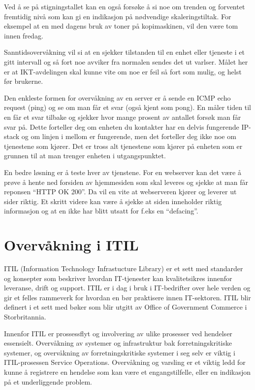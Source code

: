 Ved å se på stigningstallet kan en også forsøke å si noe om trenden og forventet fremtidig nivå som kan gi en indikasjon på nødvendige skaleringstiltak. For eksempel at en med dagens bruk av toner på kopimaskinen, vil den være tom innen fredag. 

Sanntidsovervåkning vil si at en sjekker tilstanden til en enhet eller tjeneste i et gitt intervall og så fort noe avviker fra normalen sendes det ut varlser. Målet her er at IKT-avdelingen skal kunne vite om noe er feil så fort som mulig, og helst før brukerne.

Den enkleste formen for overvåkning av en server er å sende en ICMP echo request (ping) og se om man får et svar (også kjent som pong). En måler tiden til en får et svar tilbake og sjekker hvor mange prosent av antallet forsøk man får svar på. Dette forteller deg om enheten du kontakter har en delvis fungerende IP-stack og om linjen i mellom er fungerende, men det forteller deg ikke noe om tjenestene som kjører. Det er tross alt tjenestene som kjører på enheten som er grunnen til at man trenger enheten i utgangspunktet.

En bedre løsning er å teste hver av tjenstene. For en webserver kan det være å prøve å hente ned forsiden av hjemmesiden som skal leveres og sjekke at man får reponsen “HTTP OK 200”. Da vil en vite at webserveren kjører og leverer ut sider riktig. Et skritt videre kan være å sjekke at siden inneholder riktig informasjon og at en ikke har blitt utsatt for f.eks en “defacing”.

\section{Overvåkning i ITIL}
ITIL (Information Technology Infrastucture Library) er et sett med standarder og konsepter som beskriver hvordan IT-tjenester kan kvalitetsikres innenfor leveranse, drift og support. ITIL er i dag i bruk i IT-bedrifter over hele verden og gir et felles rammeverk for hvordan en bør praktisere innen IT-sektoren. ITIL blir definert i et sett med bøker som blir utgitt av Office of Government Commerce i Storbritannia.

Innenfor ITIL er prossessflyt og involvering av ulike prosesser ved hendelser essensielt.  Overvåkning av systemer og infrastruktur bak forretningskritiske systemer, og overvåkning av forretningskritiske systemer i seg selv er viktig i ITIL-prosessen Service Operations. Overvåkning og varsling er et viktig ledd for kunne å registrere en hendelse som kan være et engangstilfelle, eller en indikasjon på et underliggende problem. 

